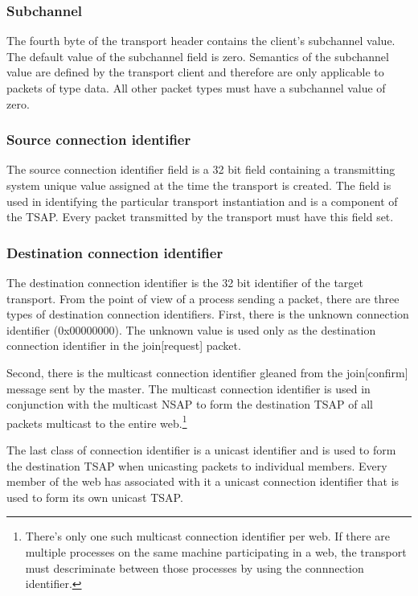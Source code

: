 \documentclass[11pt]{article}
\begin{document}
\hypertarget{subchannel}{\subsubsection{Subchannel}}

   The fourth byte of the transport header contains the client's
   subchannel value. The default value of the subchannel field is zero.
   Semantics of the subchannel value are defined by the transport client
   and therefore are only applicable to packets of type data. All other
   packet types must have a subchannel value of zero.

\hypertarget{source-connect}{\subsubsection{Source connection identifier}}

   The source connection identifier field is a 32 bit field containing a
   transmitting system unique value assigned at the time the transport
   is created. The field is used in identifying the particular transport
   instantiation and is a component of the TSAP\@. Every packet
   transmitted by the transport must have this field set.

\hypertarget{dest-connect}{\subsubsection{Destination connection identifier}}
\label{sec:dest-connect}

   The destination connection identifier is the 32 bit identifier of the
   target transport. From the point of view of a process sending a
   packet, there are three types of destination connection identifiers.
   First, there is the unknown connection identifier (0x00000000). The
   unknown value is used only as the destination connection identifier
   in the join[request] packet.

   Second, there is the multicast connection identifier gleaned from the
   join[confirm] message sent by the master. The multicast connection
   identifier is used in conjunction with the multicast NSAP to form the
   destination TSAP of all packets multicast to the entire
   web.\footnote{There's only one such multicast connection identifier per
   web. If there are multiple processes on the same machine participating
   in a web, the transport must descriminate between those processes by
   using the connnection identifier.}

   The last class of connection identifier is a unicast identifier and
   is used to form the destination TSAP when unicasting packets to
   individual members. Every member of the web has associated with it a
   unicast connection identifier that is used to form its own unicast
   TSAP.
\end{document}
